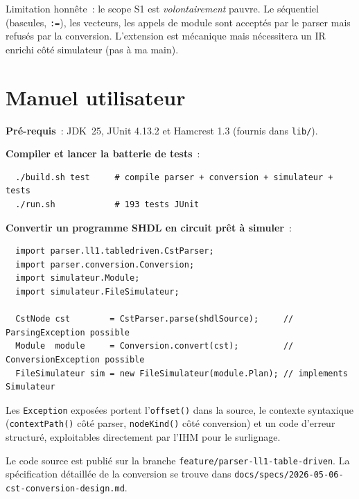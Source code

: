 \documentclass[11pt,a4paper]{article}
\begin{document}
Limitation honn\^ete~: le scope S1 est \emph{volontairement} pauvre. Le s\'equentiel (bascules, \texttt{:=}), les vecteurs, les appels de module sont accept\'es par le parser mais refus\'es par la conversion. L'extension est m\'ecanique mais n\'ecessitera un IR enrichi c\^ot\'e simulateur (pas \`a ma main).

\section*{Manuel utilisateur}

\textbf{Pr\'e-requis}~: JDK~25, JUnit 4.13.2 et Hamcrest 1.3 (fournis dans \texttt{lib/}).

\textbf{Compiler et lancer la batterie de tests}~:
\begin{verbatim}
  ./build.sh test     # compile parser + conversion + simulateur + tests
  ./run.sh            # 193 tests JUnit
\end{verbatim}

\textbf{Convertir un programme SHDL en circuit pr\^et \`a simuler}~:
\begin{verbatim}
  import parser.ll1.tabledriven.CstParser;
  import parser.conversion.Conversion;
  import simulateur.Module;
  import simulateur.FileSimulateur;

  CstNode cst        = CstParser.parse(shdlSource);     // ParsingException possible
  Module  module     = Conversion.convert(cst);         // ConversionException possible
  FileSimulateur sim = new FileSimulateur(module.Plan); // implements Simulateur
\end{verbatim}

Les \texttt{Exception} expos\'ees portent l'\texttt{offset()} dans la source, le contexte syntaxique (\texttt{contextPath()} c\^ot\'e parser, \texttt{nodeKind()} c\^ot\'e conversion) et un code d'erreur structur\'e, exploitables directement par l'IHM pour le surlignage.

Le code source est publi\'e sur la branche \texttt{feature/parser-ll1-table-driven}. La sp\'ecification d\'etaill\'ee de la conversion se trouve dans \texttt{docs/specs/2026-05-06-cst-conversion-design.md}.
\end{document}
